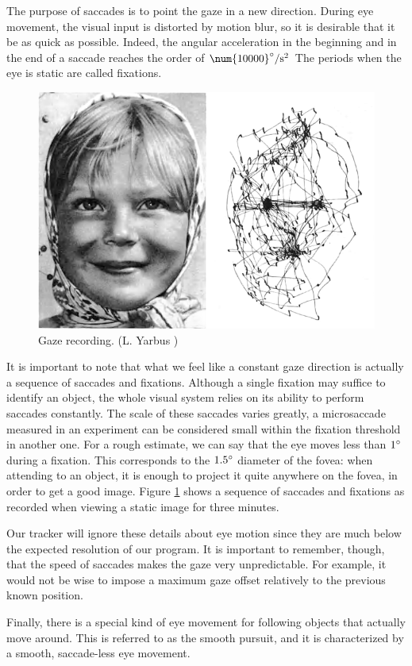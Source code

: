 The purpose of saccades is to point the gaze in a new direction.
During eye movement, the visual input is distorted by motion blur, so it is desirable that it be as quick as possible.
Indeed, the angular acceleration in the beginning and in the end of a saccade reaches the order of $\num{10000}\degree/\mathrm{s}^2$
The periods when the eye is static are called fixations.

\begin{figure}[h]
	\centering 
	\centering \includegraphics[width=0.7\linewidth]{img/analy-saccade.png}
	\caption{Gaze recording. (L. Yarbus \cite{yarbus67})}\label{i:analy-saccade}
\end{figure}

It is important to note that what we feel like a constant gaze direction is actually a sequence of saccades and fixations.
Although a single fixation may suffice to identify an object, the whole visual system relies on its ability to perform saccades constantly.
The scale of these saccades varies greatly, a microsaccade measured in an experiment can be considered small within the fixation threshold in another one.
For a rough estimate, we can say that the eye moves less than $1\degree$ during a fixation.
This corresponds to the $1.5\degree$ diameter of the fovea: when attending to an object, it is enough to project it quite anywhere on the fovea, in order to get a good image.
Figure \ref{i:analy-saccade} shows a sequence of saccades and fixations as recorded when viewing a static image for three minutes.

Our tracker will ignore these details about eye motion since they are much below the expected resolution of our program.
It is important to remember, though, that the speed of saccades makes the gaze very unpredictable.
For example, it would not be wise to impose a maximum gaze offset relatively to the previous known position.

Finally, there is a special kind of eye movement for following objects that actually move around.
This is referred to as the smooth pursuit, and it is characterized by a smooth, saccade-less eye movement.

